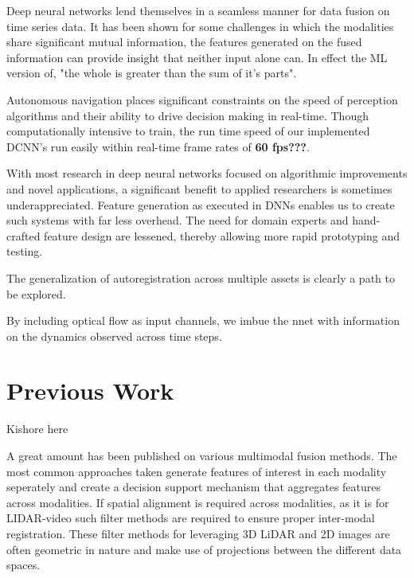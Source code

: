 \documentclass{article}
\begin{document}
Deep neural networks lend themselves in a seamless manner for data fusion on time series data. It has been shown \cite{Ngiam2011Multimodal} for some challenges in which the modalities share significant mutual information, the features generated on the fused information can provide insight that neither input alone can. In effect the ML version of, "the whole is greater than the sum of it's parts". 

Autonomous navigation places significant constraints on the speed of perception algorithms and their ability to drive decision making in real-time. Though computationally intensive to train, the run time speed of our implemented DCNN's run easily within real-time frame rates of \textbf{60 fps???}. 

With most research in deep neural networks focused on algorithmic improvements and novel applications, a significant benefit to applied researchers is sometimes underappreciated. Feature generation
as executed in DNNs enables us to create such systems with far less overhead. The need for domain experts and hand-crafted feature design are lessened, thereby allowing more rapid prototyping and testing. 

The generalization of autoregistration across multiple assets is clearly a path to be explored. 

By including optical flow as input channels, we imbue the nnet with information on the dynamics observed across time steps. 


\section{Previous Work} %
\label{sec:previous_work}
Kishore here

A great amount has been published on various multimodal fusion methods. The most common approaches taken generate features of interest in each modality seperately and create a decision support mechanism that aggregates features across modalities. If spatial alignment is required across modalities, as it is for LIDAR-video such filter methods \cite{Thrun2011Googles-dr} are required to ensure proper inter-modal registration. These filter methods for leveraging 3D LiDAR and 2D images are often geometric in nature and make use of projections between the different data spaces. 
\end{document}
